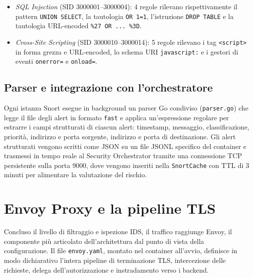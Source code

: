 \begin{itemize}
    \item \textit{SQL Injection} (SID 3000001--3000004): 4 regole rilevano rispettivamente il pattern \texttt{UNION SELECT}, la tautologia \texttt{OR 1=1}, l'istruzione \texttt{DROP TABLE} e la tautologia URL-encoded \texttt{\%27 OR ... \%3D}.

    \item \textit{Cross-Site Scripting} (SID 3000010--3000014): 5 regole rilevano i tag \texttt{<script>} in forma grezza e URL-encoded, lo schema URI \texttt{javascript:} e i gestori di eventi \texttt{onerror=} e \texttt{onload=}.
\end{itemize}

\subsection*{Parser e integrazione con l'orchestratore}

Ogni istanza Snort esegue in background un parser Go condiviso (\texttt{parser.go}) che legge il file degli alert in formato \texttt{fast} e applica un'espressione regolare per estrarre i campi strutturati di ciascun alert: timestamp, messaggio, classificazione, priorità, indirizzo e porta sorgente, indirizzo e porta di destinazione. Gli alert strutturati vengono scritti come JSON su un file JSONL specifico del container e trasmessi in tempo reale al Security Orchestrator tramite una connessione TCP persistente sulla porta 9000, dove vengono inseriti nella \texttt{SnortCache} con TTL di 3 minuti per alimentare la valutazione del rischio.

\section{Envoy Proxy e la pipeline TLS}

Concluso il livello di filtraggio e ispezione IDS, il traffico raggiunge Envoy, il componente più articolato dell'architettura dal punto di vista della configurazione. Il file \texttt{envoy.yaml}, montato nel container all'avvio, definisce in modo dichiarativo l'intera pipeline di terminazione TLS, intercezione delle richieste, delega dell'autorizzazione e instradamento verso i backend.


